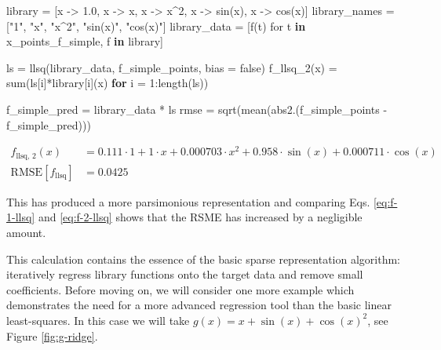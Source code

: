 \documentclass[
]{article}
\newenvironment{Shaded}{\begin{snugshade}}{\end{snugshade}}
\newcommand{\ConstantTok}[1]{\textcolor[rgb]{0.56,0.35,0.01}{#1}}
\newcommand{\ControlFlowTok}[1]{\textcolor[rgb]{0.00,0.23,0.31}{\textbf{#1}}}
\newcommand{\FloatTok}[1]{\textcolor[rgb]{0.68,0.00,0.00}{#1}}
\newcommand{\FunctionTok}[1]{\textcolor[rgb]{0.28,0.35,0.67}{#1}}
\newcommand{\KeywordTok}[1]{\textcolor[rgb]{0.00,0.23,0.31}{\textbf{#1}}}
\newcommand{\NormalTok}[1]{\textcolor[rgb]{0.00,0.23,0.31}{#1}}
\newcommand{\OperatorTok}[1]{\textcolor[rgb]{0.37,0.37,0.37}{#1}}
\newcommand{\StringTok}[1]{\textcolor[rgb]{0.13,0.47,0.30}{#1}}
\begin{document}
\begin{Shaded}
\begin{Highlighting}[]
\NormalTok{library }\OperatorTok{=}\NormalTok{ [x }\OperatorTok{{-}\textgreater{}} \FloatTok{1.0}\NormalTok{, x }\OperatorTok{{-}\textgreater{}}\NormalTok{ x, x }\OperatorTok{{-}\textgreater{}}\NormalTok{ x}\OperatorTok{\^{}}\FloatTok{2}\NormalTok{, x }\OperatorTok{{-}\textgreater{}} \FunctionTok{sin}\NormalTok{(x), x }\OperatorTok{{-}\textgreater{}} \FunctionTok{cos}\NormalTok{(x)]}
\NormalTok{library\_names }\OperatorTok{=}\NormalTok{ [}\StringTok{"1"}\NormalTok{, }\StringTok{"x"}\NormalTok{, }\StringTok{"x\^{}2"}\NormalTok{, }\StringTok{"sin(x)"}\NormalTok{, }\StringTok{"cos(x)"}\NormalTok{]}
\NormalTok{library\_data }\OperatorTok{=}\NormalTok{ [}\FunctionTok{f}\NormalTok{(t) for t }\KeywordTok{in}\NormalTok{ x\_points\_f\_simple, f }\KeywordTok{in}\NormalTok{ library]}

\NormalTok{ls }\OperatorTok{=} \FunctionTok{llsq}\NormalTok{(library\_data, f\_simple\_points, bias }\OperatorTok{=} \ConstantTok{false}\NormalTok{)}
\FunctionTok{f\_llsq\_2}\NormalTok{(x) }\OperatorTok{=} \FunctionTok{sum}\NormalTok{(ls[i]}\OperatorTok{*}\NormalTok{library[i](x) }\ControlFlowTok{for}\NormalTok{ i }\OperatorTok{=} \FloatTok{1}\OperatorTok{:}\FunctionTok{length}\NormalTok{(ls))}

\NormalTok{f\_simple\_pred }\OperatorTok{=}\NormalTok{ library\_data }\OperatorTok{*}\NormalTok{ ls}
\NormalTok{rmse }\OperatorTok{=} \FunctionTok{sqrt}\NormalTok{(}\FunctionTok{mean}\NormalTok{(}\FunctionTok{abs2}\NormalTok{.(f\_simple\_points }\OperatorTok{{-}}\NormalTok{ f\_simple\_pred)))}
\end{Highlighting}
\end{Shaded}

\begin{subequations} \label{eq:f-2-llsq} \begin{align}    f_{\text{llsq, 2}}(x) &= 0.111 \cdot 1 + 1 \cdot x + 0.000703 \cdot x^{2} + 0.958 \cdot \sin\left( x \right) + 0.000711 \cdot \cos\left( x \right) \\
    \text{RMSE}[f_{\text{llsq}}] &= 0.0425 \end{align} \end{subequations}

This has produced a more parsimonious representation and comparing Eqs.
\eqref{eq:f-1-llsq} and \eqref{eq:f-2-llsq} shows that the RSME has
increased by a negligible amount.

This calculation contains the essence of the basic sparse representation
algorithm: iteratively regress library functions onto the target data
and remove small coefficients. Before moving on, we will consider one
more example which demonstrates the need for a more advanced regression
tool than the basic linear least-squares. In this case we will take
\(g(x) = x + \sin(x) + \cos(x)^2\), see Figure \ref{fig:g-ridge}.
\end{document}
